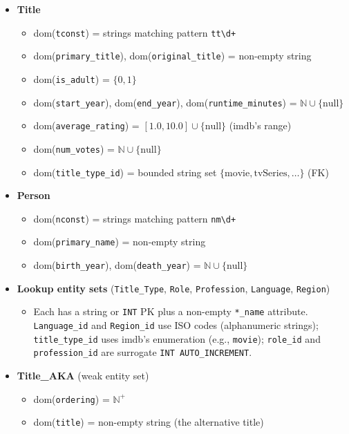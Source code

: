\begin{itemize}
  \item \textbf{Title}
  \begin{itemize}
    \item dom(\texttt{tconst}) = strings matching pattern \texttt{tt\textbackslash d+}
    \item dom(\texttt{primary\_title}), dom(\texttt{original\_title}) = non-empty string
    \item dom(\texttt{is\_adult}) = $\{0,1\}$
    \item dom(\texttt{start\_year}), dom(\texttt{end\_year}), dom(\texttt{runtime\_minutes}) = $\mathbb{N} \cup \{\text{null}\}$
    \item dom(\texttt{average\_rating}) = $[1.0, 10.0] \cup \{\text{null}\}$ (\ac{imdb}'s range)
    \item dom(\texttt{num\_votes}) = $\mathbb{N} \cup \{\text{null}\}$
    \item dom(\texttt{title\_type\_id}) = bounded string set $\{\text{movie}, \text{tvSeries}, \dots\}$ (FK)
  \end{itemize}
  \item \textbf{Person}
  \begin{itemize}
    \item dom(\texttt{nconst}) = strings matching pattern \texttt{nm\textbackslash d+}
    \item dom(\texttt{primary\_name}) = non-empty string
    \item dom(\texttt{birth\_year}), dom(\texttt{death\_year}) = $\mathbb{N} \cup \{\text{null}\}$
  \end{itemize}
  \item \textbf{Lookup entity sets} (\texttt{Title\_Type}, \texttt{Role}, \texttt{Profession}, \texttt{Language}, \texttt{Region})
  \begin{itemize}
    \item Each has a string or \texttt{INT} PK plus a non-empty \texttt{*\_name} attribute. \texttt{Language\_id} and \texttt{Region\_id} use ISO codes (alphanumeric strings); \texttt{title\_type\_id} uses \ac{imdb}'s enumeration (e.g., \texttt{movie}); \texttt{role\_id} and \texttt{profession\_id} are surrogate \texttt{INT AUTO\_INCREMENT}.
  \end{itemize}
  \item \textbf{Title\_AKA} (weak entity set)
  \begin{itemize}
    \item dom(\texttt{ordering}) = $\mathbb{N}^+$
    \item dom(\texttt{title}) = non-empty string (the alternative title)

\end{itemize}
\end{itemize}
